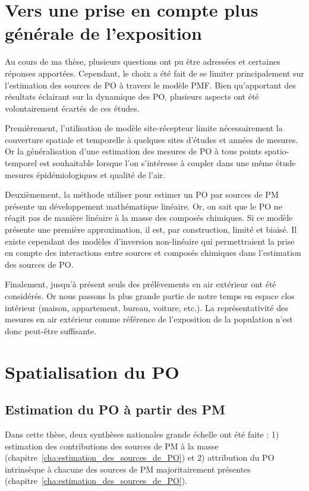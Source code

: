 
\section*{Vers une prise en compte plus générale de l'exposition}

Au cours de ma thèse, plusieurs questions ont pu être adressées et certaines réponses
apportées.  Cependant, le choix a été fait de se limiter principalement sur l'estimation
des sources de PO à travers le modèle PMF. Bien qu'apportant des résultats éclairant sur
la dynamique des PO, plusieurs aspects ont été volontairement écartés de ces études.

Premièrement, l'utilisation de modèle site-récepteur limite nécessairement la couverture
spatiale et temporelle à quelques sites d'études et années de mesures. Or la
généralisation d'une estimation des mesures de PO à tous points spatio-temporel est
souhaitable lorsque l'on s'intéresse à coupler dans une même étude mesures
épidémiologiques et qualité de l'air.

Deuxièmement, la méthode utiliser pour estimer un PO par sources de PM présente un
développement mathématique linéaire. Or, on sait que le PO ne réagit pas de manière
linéaire à la masse des composés chimiques. Si ce modèle présente une première
approximation, il est, par construction, limité et biaisé.  Il existe cependant des
modèles d'inversion non-linéaire qui permettraient la prise en compte des interactions
entre sources et composés chimiques dans l'estimation des sources de PO.

Finalement, jusqu'à présent seuls des prélèvements en air extérieur ont été considérés. Or
nous passons la plus grande partie de notre temps en espace clos intérieur (maison,
appartement, bureau, voiture, etc.).  La représentativité des mesures en air extérieur
comme référence de l'exposition de la population n'est donc peut-être suffisante.

\section{Spatialisation du PO}

\subsection{Estimation du PO à partir des PM}

Dans cette thèse, deux synthèses nationales grande échelle ont été faite : 1) estimation
des contributions des sources de PM à la masse \autocite{weberComparison2019}
(chapitre~\ref{cha:estimation_des_sources_de_PO}) et 2) attribution du PO intrinsèque à
chacune des sources de PM majoritairement présentes \autocite{weberSourceinprep.}
(chapitre~\ref{cha:estimation_des_sources_de_PO}).

